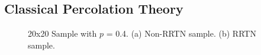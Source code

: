 \documentclass[11pt,a4paper]{report}
\begin{document}
\subsection{Classical Percolation Theory}\label{section:Classical Percolation Theory}
\begin{figure}[!b]
\begin{minipage}{.5\linewidth}
\centering
{}
\end{minipage}
\begin{minipage}{.5\linewidth}
\centering
{}

\end{minipage}\par\medskip
\caption{20x20 Sample with $p$ = 0.4. (a) Non-RRTN sample. (b) RRTN sample.}\label{fig:Simulation Sample figure}
\end{figure}
\end{document}
